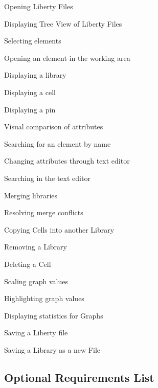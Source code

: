 \documentclass[10pt,a4paper]{report}
\begin{document}
\begin{FR}
    \item Opening Liberty Files \label{FR-1}
    \item Displaying Tree View of Liberty Files \label{FR-2}
    \item Selecting elements \label{FR-3}
    \item Opening an element in the working area \label{FR-4}
    \item Displaying a library \label{FR-5}
    \item Displaying a cell \label{FR-6}
    \item Displaying a pin \label{FR-7}
    \item Visual comparison of attributes \label{FR-8} %
    \item Searching for an element by name \label{FR-9}
    \item Changing attributes through text editor \label{FR-10}
    \item Searching in the text editor \label{FR-11}
    \item Merging libraries \label{FR-12}
    \item Resolving merge conflicts \label{FR-13}
    \item Copying Cells into another Library \label{FR-14}
    \item Removing a Library \label{FR-15}
    \item Deleting a Cell \label{FR-16}
    \item Scaling graph values \label{FR-17}
    \item Highlighting graph values \label{FR-18}
    \item Displaying statistics for Graphs \label{FR-19}
    \item Saving a Liberty file \label{FR-20}
    \item Saving a Library as a new File \label{FR-21}
\end{FR}
\subsection{Optional Requirements List}
\end{document}
